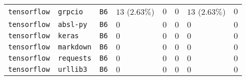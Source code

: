 \begin{table}
\begin{tabular}{llllllll}
\texttt{tensorflow} & \texttt{grpcio} & \texttt{B6} & $13$ ($2.63\%$) & $0$ & $0$ & $13$ ($2.63\%$) & $0$ \\
\texttt{tensorflow} & \texttt{absl-py} & \texttt{B6} & $0$ & $0$ & $0$ & $0$ & $0$ \\
\texttt{tensorflow} & \texttt{keras} & \texttt{B6} & $0$ & $0$ & $0$ & $0$ & $0$ \\
\texttt{tensorflow} & \texttt{markdown} & \texttt{B6} & $0$ & $0$ & $0$ & $0$ & $0$ \\
\texttt{tensorflow} & \texttt{requests} & \texttt{B6} & $0$ & $0$ & $0$ & $0$ & $0$ \\
\texttt{tensorflow} & \texttt{urllib3} & \texttt{B6} & $0$ & $0$ & $0$ & $0$ & $0$ \\
\bottomrule
\end{tabular}
\end{table}
